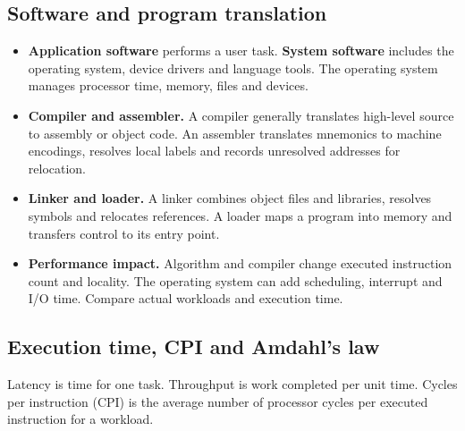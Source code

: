 \documentclass[12pt,a4paper]{article}
\begin{document}
\subsection{Software and program translation}
\begin{itemize}[leftmargin=*,itemsep=3pt]
\item \textbf{Application software} performs a user task. \textbf{System software} includes the operating system, device drivers and language tools. The operating system manages processor time, memory, files and devices.
\item \textbf{Compiler and assembler.} A compiler generally translates high-level source to assembly or object code. An assembler translates mnemonics to machine encodings, resolves local labels and records unresolved addresses for relocation.
\item \textbf{Linker and loader.} A linker combines object files and libraries, resolves symbols and relocates references. A loader maps a program into memory and transfers control to its entry point.
\item \textbf{Performance impact.} Algorithm and compiler change executed instruction count and locality. The operating system can add scheduling, interrupt and I/O time. Compare actual workloads and execution time.
\end{itemize}
\subsection{Execution time, CPI and Amdahl's law}
\begin{tcolorbox}[defbox,title={Latency, throughput and CPI}]
Latency is time for one task. Throughput is work completed per unit time. Cycles per instruction (CPI) is the average number of processor cycles per executed instruction for a workload.
\end{tcolorbox}
\end{document}
